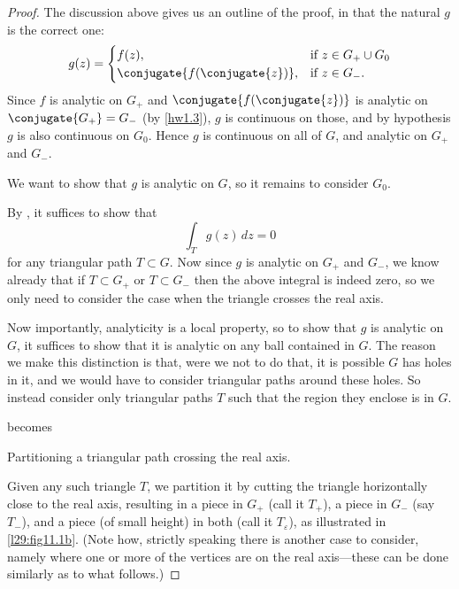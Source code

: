 \begin{proof}
	The discussion above gives us an outline of the proof, in that the natural $g$ is the correct one:
	\[
		g(z) = \begin{cases}
			f(z), & \text{if $z \in G_+ \cup G_0$} \\
			\conjugate{f(\conjugate{z})}, & \text{if $z \in G_-$}.
		\end{cases}
	\]
	Since $f$ is analytic on $G_+$ and $\conjugate{f(\conjugate{z})}$ is analytic on $\conjugate{G_+} = G_-$ (by \autoref{hw1.3}), $g$ is continuous on those, and by hypothesis $g$ is also continuous on $G_0$.
	Hence $g$ is continuous on all of $G$, and analytic on $G_+$ and $G_-$.

	We want to show that $g$ is analytic on $G$, so it remains to consider $G_0$.

	By , it suffices to show that
	\[
		\int_T g(z) \, d z = 0
	\]
	for any triangular path $T \subset G$.
	Now since $g$ is analytic on $G_+$ and $G_-$, we know already that if $T \subset G_+$ or $T \subset G_-$ then the above integral is indeed zero, so we only need to consider the case when the triangle crosses the real axis.

	Now importantly, analyticity is a local property, so to show that $g$ is analytic on $G$, it suffices to show that it is analytic on any ball contained in $G$.
	The reason we make this distinction is that, were we not to do that, it is possible $G$ has holes in it, and we would have to consider triangular paths around these holes.
	So instead consider only triangular paths $T$ such that the region they enclose is in $G$.

\begin{marginfigure}
	\centering

	becomes


	\caption{\label{l29:fig11.1b} Partitioning a triangular path crossing the real axis.}
\end{marginfigure}

	Given any such triangle $T$, we partition it by cutting the triangle horizontally close to the real axis, resulting in a piece in $G_+$ (call it $T_+$), a piece in $G_-$ (say $T_-$), and a piece (of small height) in both (call it $T_\varepsilon$), as illustrated in \autoref{l29:fig11.1b}.
	(Note how, strictly speaking there is another case to consider, namely where one or more of the vertices are on the real axis---these can be done similarly as to what follows.)


\end{proof}
